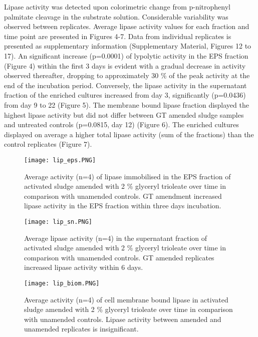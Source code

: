 \documentclass[twoside]{article}
\begin{document}
Lipase activity was detected upon colorimetric change from p-nitrophenyl palmitate cleavage in the substrate solution. 
Considerable variability was observed between replicates. Average lipase activity values for each fraction and time point are presented in Figures 4-7. Data from individual replicates is presented as supplementary information (Supplementary Material,  Figures 12 to 17).
An significant increase (p=0.0001) of lypolytic activity in the EPS fraction (Figure 4) within the first 3 days is evident with a gradual decrease in activity observed thereafter, dropping to approximately 30 \% of the peak activity at  the end of the incubation period. 
Conversely, the lipase activity in the supernatant fraction of the enriched cultures increased from day 3,  significantly (p=0.0436) from day 9 to 22 (Figure 5). The membrane bound lipase fraction displayed the highest lipase activity but did not differ between GT amended sludge samples and untreated controls (p=0.0815, day 12) (Figure 6). The enriched cultures displayed on average a higher total lipase activity (sum of the fractions) than the control replicates (Figure 7).
\begin{figure}
\texttt{[image: lip\_eps.PNG]}
\caption{Average activity (n=4) of lipase immobilised in the EPS fraction of activated sludge amended with 2 \% glyceryl trioleate over time in comparison with unamended controls. GT amendment increased lipase activity in the EPS fraction within three days incubation.}
\end{figure}
\begin{figure}
\texttt{[image: lip\_sn.PNG]}
\caption{Average lipase activity (n=4) in the supernatant fraction of activated sludge amended with 2 \% glyceryl trioleate over time in comparison with unamended controls. GT amended replicates increased lipase activity within 6 days.}
\end{figure}

\begin{figure}
\texttt{[image: lip\_biom.PNG]}
\caption{Average activity (n=4) of cell membrane bound lipase in activated sludge amended with 2 \% glyceryl trioleate over time in comparison with unamended controls. Lipase activity between amended and unamended replicates is insignificant.}
\end{figure}
\end{document}
